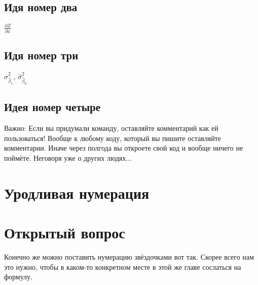 \documentclass[12pt, a4paper]{article}
\theoremstyle{plain}              %
\theoremstyle{definition}         %
\renewcommand{\thepage}{\ifthispageodd{\Asbuk{page}}{\Roman{page}}}
\begin{document}
\subsection{Идя номер два} 

\newcommand{\defp}[2]{$\frac{\partial{#1}}{\partial{#2}}$}

\defp{Z}{x}


\subsection{Идя номер три} 

\newcommand{\sbh}[1]{\ensuremath{\displaystyle \hat\sigma_{\hat\beta_#1}^2}}

\sbh{1}, \sbh{0}

\subsection{Идея номер четыре} 


\newcommand{\pic}[3]{\begin{figure}[H]
\begin{center}
\texttt{[image: \#2]}
\caption{#3}
\end{center}
\end{figure}}


Важно: Если вы придумали команду, оставляйте комментарий как ей пользоваться! Вообще к любому коду, который вы пишите оставляйте комментарии. Иначе через полгода вы откроете свой код и вообще ничего не поймёте. Неговоря уже о других людях...


\section{Уродливая нумерация}


  


\section{Открытый вопрос} 

Конечно же можно поставить нумерацию звёздочками вот так. Скорее всего нам это нужно, чтобы в каком-то конкретном месте в этой же главе сослаться на формулу.
\end{document}
